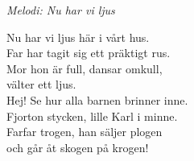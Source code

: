 {\footnotesize\textit{Melodi: Nu har vi ljus}}\par
\vspace{10pt}
Nu har vi ljus här i vårt hus.\\
Far har tagit sig ett präktigt rus.\\
Mor hon är full, dansar omkull,\\
välter ett ljus.\\
Hej! Se hur alla barnen brinner inne.\\
Fjorton stycken, lille Karl i minne.\\
Farfar trogen, han säljer plogen\\
och går åt skogen på krogen!
